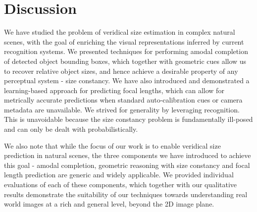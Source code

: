 \section{Discussion}
We have studied the problem of veridical size estimation in complex natural scenes, with the goal of enriching the visual representations inferred by current recognition systems. We presented techniques for performing amodal completion of detected object bounding boxes, which together with geometric cues allow us to recover relative object sizes, and hence achieve a desirable property of any perceptual system - size constancy. We have also introduced and demonstrated a learning-based approach for predicting focal lengths, which can allow for metrically accurate predictions when standard auto-calibration cues or camera metadata are unavailable. We strived for generality by leveraging recognition. This is unavoidable because the size constancy problem is fundamentally ill-posed and can only be dealt with probabilistically.

We also note that while the focus of our work is to enable veridical size prediction in natural scenes, the three components we have introduced to achieve this goal - amodal completion, geometric reasoning with size constancy and focal length prediction are generic and widely applicable. We provided individual evaluations of each of these components, which together with our qualitative results demonstrate the suitability of our techniques towards understanding real world images at a rich and general level, beyond the 2D image plane.